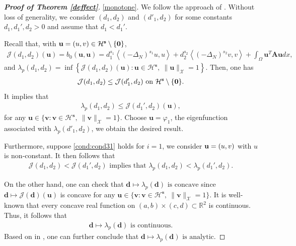 \documentclass[a4paper,11pt]{amsart}
\theoremstyle{definition}
\def\R{\mathbb{R}}
\def\O{\Omega}
\numberwithin{equation}{section}
\theoremstyle{definition}
\def\O{\Omega}
\begin{document}
\begin{proof} [\bf Proof of Theorem \ref{deffect}]


\ref{monotone}. We follow the approach of \cite{nguyen_dynamics_2022,ninh_vo_asymptotic_2025}.   Without loss of generality, we consider $(d_1,d_2)$ and $(d'_1,d_2)$ for some constants $d_1,d_1',d_2>0$ and assume that $d_1<d_1'$.

Recall that, with $\textbf{u}=(u,v)\in \mathcal{H}^{\bf s}\setminus\{\textbf{0}\}$,
\begin{align*}
\mathcal{J}({ d_1,d_2})(\textbf{u})=b_0(\textbf{u},\textbf{u})=d_1^{s_1}\left<(-\Delta_N)^{s_1}u,u\right>+d_2^{s_2}\left<(-\Delta_N)^{s_2}v,v\right>+\int_{\O}\textbf{u}^T\textbf{A}\textbf{u}dx,
\end{align*}
and
$
\lambda_p(d_1,d_2)=\inf\left\{ \mathcal{J}({ d_1,d_2})(\textbf{u}):\textbf{u}\in \mathcal{H}^{\textbf{s}},~\|\textbf{u}\|_{\mathcal{X}}=1\right\}.
$ 
Then, one has
\begin{align*}
\mathcal{J}({ d_1,d_2})\leq \mathcal{J}({ d_1',d_2}) \text{ on }\mathcal{H}^{\bf s}\setminus\{\textbf{0}\}.
\end{align*}
It implies that
\begin{align*}
\lambda_p(d_1,d_2)\leq \mathcal{J}({ d_1',d_2})(\textbf{u}),
\end{align*}
for any $\textbf{u}\in \{\textbf{v}:\textbf{v}\in \mathcal{H}^{\textbf{s}},~\|\textbf{v}\|_{\mathcal{X}}=1\}$. Choose $\textbf{u}=\varphi_1$, the eigenfunction associated with $\lambda_p(d'_1,d_2)$, we obtain the desired result. 

Furthermore, suppose \ref{cond:cond31} holds for $i=1$,  we consider ${\bf u}=(u,v)$ with $u$ is non-constant. It then follows that
\begin{align*}
\mathcal{J}({ d_1,d_2})< \mathcal{J}({ d_1',d_2}) \text{ implies that }\lambda_p(d_1,d_2)<\lambda_p(d_1',d_2).
\end{align*}

On the other hand, one can check that $\textbf{d}\mapsto \lambda_p(\textbf{d}) \text{ is concave}$
since $\textbf{d} \mapsto \mathcal{J}(\textbf{d})(\textbf{u})$ is concave for any $\textbf{u}\in \{\textbf{v}:\textbf{v}\in \mathcal{H}^{\textbf{s}},~\|\textbf{v}\|_{\mathcal{X}}=1\}$. It is well-known that every concave real function on $(a,b)\times(c,d)\subset \R^2$ is continuous. Thus, it follows  that
\begin{align*}
\textbf{d}\mapsto \lambda_p(\textbf{d}) \text{ is continuous.}
\end{align*}
Based on in \cite[Chapter 7, Theorem 1.8 and Section 2, p 375]{kato_1976}, one can further conclude that $\textbf{d}\mapsto \lambda_p(\textbf{d}) \text{ is analytic.}$



\end{proof}
\end{document}
